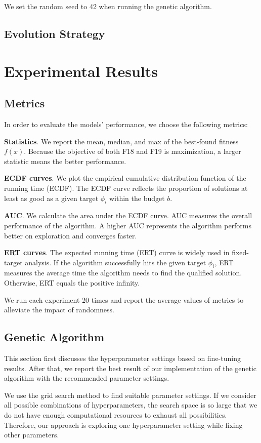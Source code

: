 \documentclass{article}
\begin{document}
We set the random seed to 42 when running the genetic algorithm.

\subsection{Evolution Strategy}


\section{Experimental Results}\label{sec:experi}
\subsection{Metrics}
In order to evaluate the models' performance, we choose the following metrics:

\textbf{Statistics}. We report the mean, median, and max of the best-found fitness $f(x)$. Because the objective of both F18 and F19 is maximization, a larger statistic means the better performance.

\textbf{ECDF curves}. We plot the empirical cumulative distribution function of the running time (ECDF). The ECDF curve reflects the proportion of solutions at least as good as a given target $\phi_i$ within the budget $b$.

\textbf{AUC}. We calculate the area under the ECDF curve. AUC measures the overall performance of the algorithm. A higher AUC represents the algorithm performs better on exploration and converges faster.

\textbf{ERT curves}. The expected running time (ERT) curve is widely used in fixed-target analysis. If the algorithm successfully hits the given target $\phi_i$, ERT measures the average time the algorithm needs to find the qualified solution. Otherwise, ERT equals the positive infinity.

We run each experiment 20 times and report the average values of metrics to alleviate the impact of randomness.

\subsection{Genetic Algorithm}
This section first discusses the hyperparameter settings based on fine-tuning results. After that, we report the best result of our implementation of the genetic algorithm with the recommended parameter settings.

We use the grid search method to find suitable parameter settings. If we consider all possible combinations of hyperparameters, the search space is so large that we do not have enough computational resources to exhaust all possibilities. Therefore, our approach is exploring one hyperparameter setting while fixing other parameters.
\end{document}
